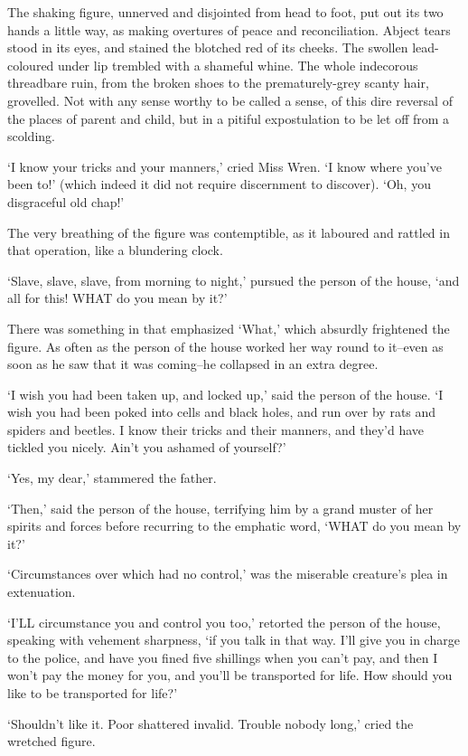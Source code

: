 The shaking figure, unnerved and disjointed from head to foot, put
out its two hands a little way, as making overtures of peace and
reconciliation. Abject tears stood in its eyes, and stained the blotched
red of its cheeks. The swollen lead-coloured under lip trembled with a
shameful whine. The whole indecorous threadbare ruin, from the broken
shoes to the prematurely-grey scanty hair, grovelled. Not with any sense
worthy to be called a sense, of this dire reversal of the places of
parent and child, but in a pitiful expostulation to be let off from a
scolding.

‘I know your tricks and your manners,’ cried Miss Wren. ‘I know where
you’ve been to!’ (which indeed it did not require discernment to
discover). ‘Oh, you disgraceful old chap!’

The very breathing of the figure was contemptible, as it laboured and
rattled in that operation, like a blundering clock.

‘Slave, slave, slave, from morning to night,’ pursued the person of the
house, ‘and all for this! WHAT do you mean by it?’

There was something in that emphasized ‘What,’ which absurdly frightened
the figure. As often as the person of the house worked her way round to
it--even as soon as he saw that it was coming--he collapsed in an extra
degree.

‘I wish you had been taken up, and locked up,’ said the person of the
house. ‘I wish you had been poked into cells and black holes, and run
over by rats and spiders and beetles. I know their tricks and their
manners, and they’d have tickled you nicely. Ain’t you ashamed of
yourself?’

‘Yes, my dear,’ stammered the father.

‘Then,’ said the person of the house, terrifying him by a grand muster
of her spirits and forces before recurring to the emphatic word, ‘WHAT
do you mean by it?’

‘Circumstances over which had no control,’ was the miserable creature’s
plea in extenuation.

‘I’LL circumstance you and control you too,’ retorted the person of the
house, speaking with vehement sharpness, ‘if you talk in that way. I’ll
give you in charge to the police, and have you fined five shillings when
you can’t pay, and then I won’t pay the money for you, and you’ll be
transported for life. How should you like to be transported for life?’

‘Shouldn’t like it. Poor shattered invalid. Trouble nobody long,’ cried
the wretched figure.

